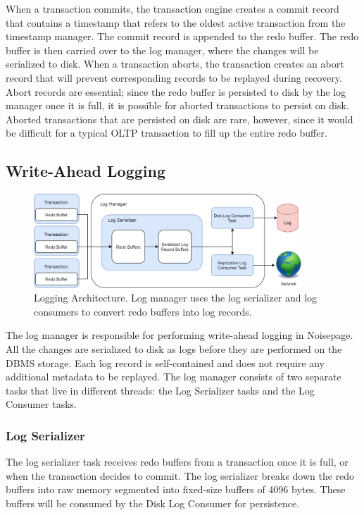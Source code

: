 \documentclass[12pt]{cmuthesis}
\begin{document}
When a transaction commits, the transaction engine creates a commit record that contains a timestamp that refers to the oldest active transaction from the timestamp manager. The commit record is appended to the redo buffer. The redo buffer is then carried over to the log manager, where the changes will be serialized to disk. When a transaction aborts, the transaction creates an abort record that will prevent corresponding records to be replayed during recovery. Abort records are essential; since the redo buffer is persisted to disk by the log manager once it is full, it is possible for aborted transactions to persist on disk. Aborted transactions that are persisted on disk are rare, however, since it would be difficult for a typical OLTP transaction to fill up the entire redo buffer.

\subsection{Write-Ahead Logging}
\begin{figure}[H]
\centering
\includegraphics[width=0.9\textwidth]{images/WAL.png}
\caption{Logging Architecture. Log manager uses the log serializer and log consumers to convert redo buffers into log records.}
\label{fig:wal}
\end{figure}

The log manager is responsible for performing write-ahead logging in Noisepage. All the changes are serialized to disk as logs before they are performed on the DBMS storage. Each log record is self-contained and does not require any additional metadata to be replayed. The log manager consists of two separate tasks that live in different threads: the Log Serializer tasks and the Log Consumer tasks.

\subsubsection{Log Serializer}
The log serializer task receives redo buffers from a transaction once it is full, or when the transaction decides to commit. The log serializer breaks down the redo buffers into raw memory segmented into fixed-size buffers of 4096 bytes. These buffers will be consumed by the Disk Log Consumer for persistence.
\end{document}
